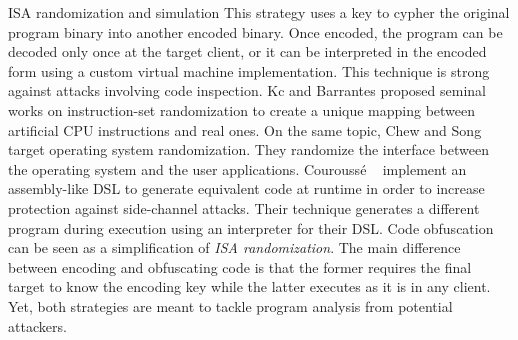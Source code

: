 \begin{strategy}{ISA randomization and simulation}
    \label{strategy:S5}
    \normalfont
    This strategy uses a key to cypher the original program binary into another encoded binary. 
    Once encoded, the program can be decoded only once at the target client, or it can be interpreted in the encoded form using a custom virtual machine implementation. This technique is strong against attacks involving code inspection. 
    Kc \etal \cite{Kc03} and Barrantes \etal \cite{barrantes2003randomized} proposed seminal works on instruction-set randomization 
    to create a unique mapping between artificial CPU instructions and real ones.
    On the same topic, Chew and Song \cite{Chew02mitigatingbuffer} target operating system randomization. They randomize the interface between the operating system and the user applications.
    Courouss{\'e} \etal~\cite{courousse2016runtime} implement an assembly-like DSL to generate equivalent code at runtime in order to increase protection against side-channel attacks. Their technique generates a different program during execution using an interpreter for their DSL.
    Code obfuscation \cite{wobfuscator} can be seen as a simplification of \emph{ISA randomization}. The main difference between encoding and obfuscating code is that the former requires the final target to know the encoding key while the latter executes as it is in any client. Yet, both strategies are meant to tackle program analysis from potential attackers. 

    
\end{strategy}

 


